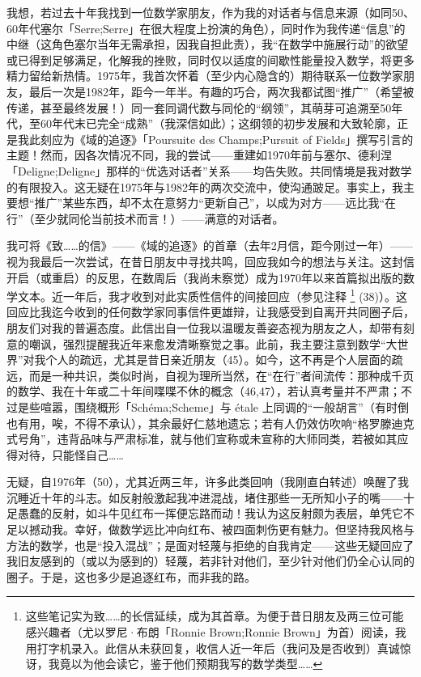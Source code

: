 我想，若过去十年我找到一位数学家朋友，作为我的对话者与信息来源（如同50、60年代塞尔「Serre;Serre」在很大程度上扮演的角色），同时作为我传递“信息”的中继（这角色塞尔当年无需承担，因我自担此责），我“在数学中施展行动”的欲望或已得到足够满足，化解我的挫败，同时仅以适度的间歇性能量投入数学，将更多精力留给新热情。1975年，我首次怀着（至少内心隐含的）期待联系一位数学家朋友，最后一次是1982年，距今一年半。有趣的巧合，两次我都试图“推广”（希望被传递，甚至最终发展！）同一套同调代数与同伦的“纲领”，其萌芽可追溯至50年代，至60年代末已完全“成熟”（我深信如此）；这纲领的初步发展和大致轮廓，正是我此刻应为《域的追逐》「Poursuite des Champs;Pursuit of Fields」撰写引言的主题！然而，因各次情况不同，我的尝试——重建如1970年前与塞尔、德利涅「Deligne;Deligne」那样的“优选对话者”关系——均告失败。共同情境是我对数学的有限投入。这无疑在1975年与1982年的两次交流中，使沟通跛足。事实上，我主要想“推广”某些东西，却不太在意努力“更新自己”，以成为对方——远比我“在行”（至少就同伦当前技术而言！）——满意的对话者。

我可将《致……的信》——《域的追逐》的首章（去年2月信，距今刚过一年）——视为我最后一次尝试，在昔日朋友中寻找共鸣，回应我如今的想法与关注。这封信开启（或重启）的反思，在数周后（我尚未察觉）成为1970年以来首篇拟出版的数学文本。近一年后，我才收到对此实质性信件的间接回应（参见注释 \footnote{这些笔记实为致……的长信延续，成为其首章。为便于昔日朋友及两三位可能感兴趣者（尤以罗尼·布朗「Ronnie Brown;Ronnie Brown」为首）阅读，我用打字机录入。此信从未获回复，收信人近一年后（我问及是否收到）真诚惊讶，我竟以为他会读它，鉴于他们预期我写的数学类型……} (38)）。这回应比我迄今收到的任何数学家同事信件更雄辩，让我感受到自离开共同圈子后，朋友们对我的普遍态度。此信出自一位我以温暖友善姿态视为朋友之人，却带有刻意的嘲讽，强烈提醒我近年来愈发清晰察觉之事。此前，我主要注意到数学“大世界”对我个人的疏远，尤其是昔日亲近朋友（45）。如今，这不再是个人层面的疏远，而是一种共识，类似时尚，自视为理所当然，在“在行”者间流传：那种成千页的数学、我在十年或二十年间喋喋不休的概念（46,47），若认真考量并不严肃；不过是些喧嚣，围绕概形「Schéma;Scheme」与 étale 上同调的“一般胡言”（有时倒也有用，唉，不得不承认），其余最好仁慈地遗忘；若有人仍效仿吹响“格罗滕迪克式号角”，违背品味与严肃标准，就与他们宣称或未宣称的大师同类，若被如其应得对待，只能怪自己……

无疑，自1976年（50），尤其近两三年，许多此类回响（我刚直白转述）唤醒了我沉睡近十年的斗志。如反射般激起我冲进混战，堵住那些一无所知小子的嘴——十足愚蠢的反射，如斗牛见红布一挥便忘路而动！我认为这反射颇为表层，单凭它不足以撼动我。幸好，做数学远比冲向红布、被四面刺伤更有魅力。但坚持我风格与方法的数学，也是“投入混战”；是面对轻蔑与拒绝的自我肯定——这些无疑回应了我旧友感到的（或以为感到的）轻蔑，若非针对他们，至少针对他们仍全心认同的圈子。于是，这也多少是追逐红布，而非我的路。

